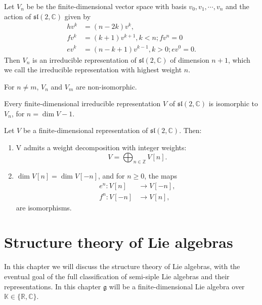 \documentclass{report}
\begin{document}
\begin{theorem}
    Let $V_n$ be be the finite-dimensional vector space with basis $v_0, v_1, \cdots, v_n$ and the action of $\mathfrak{sl}(2, \mathbb C)$ given by
    \begin{align*}
        h v^k &= (n - 2k) v^k,\\
        f v^k &= (k+1) v^{k+1}, k < n; fv^n = 0\\
        e v^k &= (n - k + 1) v^{k-1}, k > 0; ev^0 = 0.        
    \end{align*}
    Then $V_n$ is an irreducible representation of $\mathfrak{sl}(2, \mathbb C)$ of dimension $n+1$, which we call the irreducible representation with highest weight $n$.
    \item For $n \neq m$, $V_n$ and $V_m$ are non-isomorphic.
    \item Every finite-dimensional irreducible representation $V$ of $\mathfrak{sl}(2, \mathbb C)$ is isomorphic to $V_n$, for $n = \dim V - 1$.
    \item Let $V$ be a finite-dimensional representation of $\mathfrak{sl}(2, \mathbb C)$. Then:
    \begin{enumerate}[label = (\roman*)]
        \item V admits a weight decomposition with integer weights:
        \[
        V = \bigoplus_{n \in \mathbb Z} V[n].
        \]
        \item $\dim V[n] = \dim V[-n]$, and for $n \geq 0$, the maps
        \begin{align*}
            e^n: V[n] &\rightarrow V[-n],\\
            f^n: V[-n] &\rightarrow V[n],
        \end{align*}
        are isomorphisms.
    \end{enumerate}
\end{theorem}


\chapter{Structure theory of Lie algebras}
In this chapter we will discuss the structure theory of Lie algebras, with the eventual goal of the full classification of semi-siple Lie algebras and their representations.
In this chapter $\mathfrak g$ will be a finite-dimensional Lie algebra over $\mathbb K \in \{\mathbb R, \mathbb C\}$.
\end{document}
